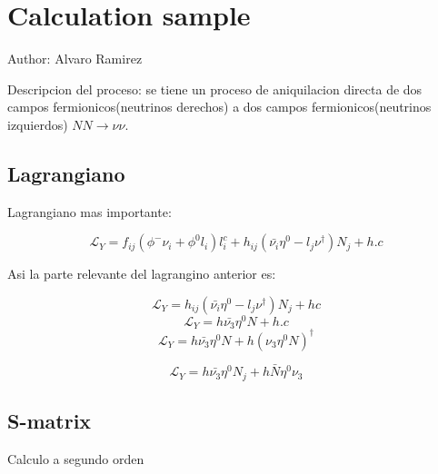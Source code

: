 \chapter{Calculation sample}

Author: Alvaro Ramirez

Descripcion del proceso: se tiene un proceso de aniquilacion directa de dos campos fermionicos(neutrinos derechos) a dos campos fermionicos(neutrinos izquierdos) $NN\to \nu\nu$.

\section{Lagrangiano}

Lagrangiano mas importante:

\begin {equation}
	\mathcal{L}_{Y}=f_{ij}({\phi}^{-}{\nu}_{i}+{\phi}^{0}{l}_{i}){l}_{i}^c+{h}_{ij}(\bar{{\nu}_{i}}{\eta}^0-{l}_{j}{\nu}^{\dagger}){N}_{j}+h.c
\end{equation}

Asi la parte relevante del lagrangino anterior es:

\begin {equation}
\mathcal{L}_{Y}={h}_{ij}(\bar{{\nu}_{i}}{\eta}^0-{l}_{j}{\nu}^{\dagger}){N}_{j}+hc
\end{equation}
\begin {equation}
\mathcal{L}_{Y}=h\bar{{\nu}_{3}}{\eta}^0{N}+h.c
\end{equation}
\begin {equation}
\mathcal{L}_{Y}=h\bar{{\nu}_{3}}{\eta}^0{N}+h(\nu_{3}{\eta}^{0}N)^{\dagger}
\end{equation}

\begin {equation}
\mathcal{L}_{Y}=h\bar{{\nu}_{3}}{\eta}^0{N}_{j}+h\bar{N}\eta^{0}\nu_{3}
\end{equation}


\section{S-matrix}

Calculo a segundo orden


